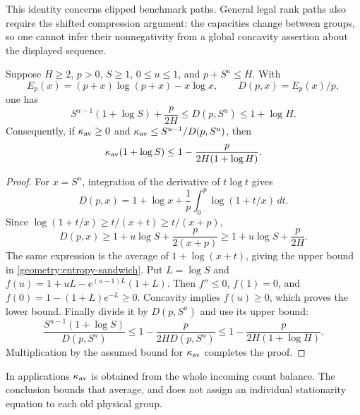 This identity concerns clipped benchmark paths. General legal rank paths
also require the shifted compression argument: the capacities change
between groups, so one cannot infer their nonnegativity from a global
concavity assertion about the displayed sequence.

\begin{lemma}
\label{geometry:entropy-denominator}
Suppose $H\ge2$, $p>0$, $S\ge1$, $0\le u\le1$, and $p+S^u\le H$.
With
\[
 E_p(x)=(p+x)\log(p+x)-x\log x,
 \qquad D(p,x)=E_p(x)/p,
\]
one has
\begin{equation}
 S^{u-1}(1+\log S)+\frac p{2H}
       \le D(p,S^u)\le1+\log H.\label{geometry:entropy-sandwich}
\end{equation}
Consequently, if $\kappa_{\rm av}\ge0$ and
$\kappa_{\rm av}\le S^{u-1}/D(p,S^u)$, then
\[
 \kappa_{\rm av}(1+\log S)
        \le1-\frac p{2H(1+\log H)}.
\]
\end{lemma}
\begin{proof}
For $x=S^u$, integration of the derivative of $t\log t$ gives
\[
 D(p,x)=1+\log x+\frac1p\int_0^p\log(1+t/x)\,dt.
\]
Since $\log(1+t/x)\ge t/(x+t)\ge t/(x+p)$,
\[
 D(p,x)\ge1+u\log S+\frac p{2(x+p)}
             \ge1+u\log S+\frac p{2H}.
\]
The same expression is the average of $1+\log(x+t)$, giving the upper
bound in \eqref{geometry:entropy-sandwich}. Put $L=\log S$ and
$f(u)=1+uL-e^{(u-1)L}(1+L)$. Then $f''\le0$,
$f(1)=0$, and $f(0)=1-(1+L)e^{-L}\ge0$. Concavity implies $f(u)\ge0$,
which proves the lower bound. Finally divide it by $D(p,S^u)$ and use
its upper bound:
\[
 \frac{S^{u-1}(1+\log S)}{D(p,S^u)}
 \le1-\frac p{2H D(p,S^u)}
 \le1-\frac p{2H(1+\log H)}.
\]
Multiplication by the assumed bound for $\kappa_{\rm av}$ completes
the proof.
\end{proof}

In applications $\kappa_{\rm av}$ is obtained from the whole incoming
count balance. The conclusion bounds that average, and does not assign
an individual stationarity equation to each old physical group.
